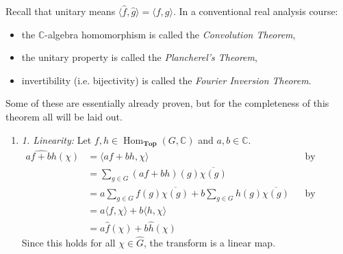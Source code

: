 \documentclass{article}
\newcommand{\C}{{\mathbb{C}}}
\newcommand{\Top}{{\textbf{Top}}}
\newcommand{\Hom}{{\operatorname{Hom}}}
\begin{document}
Recall that unitary means $\langle \hat{f}, \hat{g} \rangle = \langle f,g \rangle$.
In a conventional real analysis course:
\begin{itemize}
  \item the $\C$-algebra homomorphism is called the  \emph{Convolution Theorem},
  \item the unitary property is called the \emph{Plancherel's Theorem},
  \item invertibility (i.e. bijectivity) is called the \emph{Fourier Inversion Theorem}.
\end{itemize}
\begin{Proof}
  Some of these are essentially already proven, but for the completeness of this theorem all will be laid
  out.
	\begin{enumerate}
		\item \textit{1. Linearity:} Let $f, h \in \Hom_\Top(G, \C)$ and $a,b \in \C$.
		\begin{align*}
			\widehat{af+bh}(\chi) &= \langle af+bh, \chi \rangle && \text{by definition} \\
			&= \sum_{g\in G} (af+bh)(g) \overline{\chi(g)} \\
			&= a\sum_{g\in G} f(g)\overline{\chi(g)} + b\sum_{g\in G} h(g)\overline{\chi(g)} && \text{by linearity of sums}\\
			&= a\langle f, \chi \rangle + b\langle h, \chi \rangle \\
			&= a\hat{f}(\chi) + b\hat{h}(\chi)
		\end{align*}
		Since this holds for all $\chi \in \hat{G}$, the transform is a linear map.


\end{enumerate}
\end{Proof}
\end{document}
